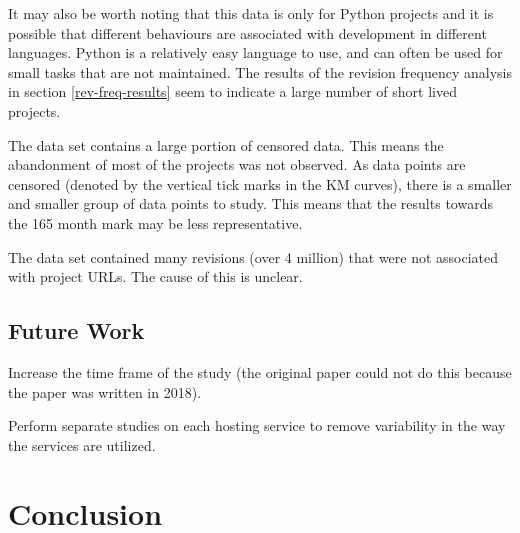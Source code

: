 \documentclass[acmconf]{acmart}
\begin{document}
It may also be worth noting that this data is only for Python projects and it is possible that different behaviours are associated with development in different languages.
Python is a relatively easy language to use, and can often be used for small tasks that are not maintained.
The results of the revision frequency analysis in section \ref{rev-freq-results} seem to indicate a large number of short lived projects.

The data set contains a large portion of censored data.
This means the abandonment of most of the projects was not observed.
As data points are censored (denoted by the vertical tick marks in the KM curves), there is a smaller and smaller group of data points to study.
This means that the results towards the 165 month mark may be less representative.

The data set contained many revisions (over 4 million) that were not associated with project URLs.
The cause of this is unclear.

\subsection{Future Work} \label{future}


Increase the time frame of the study (the original paper could not do this because the paper was written in 2018).

Perform separate studies on each hosting service to remove variability in the way the services are utilized.




\section{Conclusion} \label{conclusion}
\end{document}
